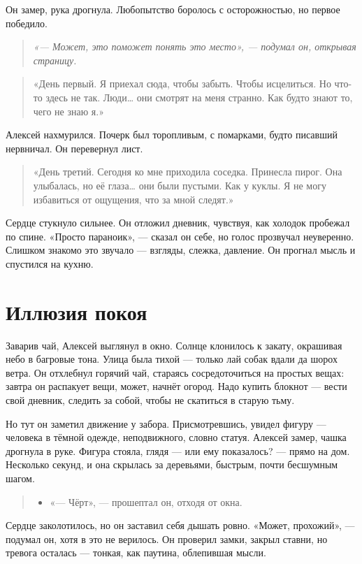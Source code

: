 \documentclass[12pt,a4paper]{book}
\newenvironment{dialogue}{\begin{quote}\itshape\begin{itemize}\item[]}{\end{itemize}\end{quote}}
\newenvironment{innerthought}{\begin{quote}\small\itshape}{\end{quote}}
\begin{document}
Он замер, рука дрогнула. Любопытство боролось с осторожностью, но первое победило.

\begin{innerthought}
«— Может, это поможет понять это место», — подумал он, открывая страницу.
\end{innerthought}

\begin{quote}
«День первый. Я приехал сюда, чтобы забыть. Чтобы исцелиться. Но что-то здесь не так. Люди… они смотрят на меня странно. Как будто знают то, чего не знаю я.»
\end{quote}

Алексей нахмурился. Почерк был торопливым, с помарками, будто писавший нервничал. Он перевернул лист.

\begin{quote}
«День третий. Сегодня ко мне приходила соседка. Принесла пирог. Она улыбалась, но её глаза… они были пустыми. Как у куклы. Я не могу избавиться от ощущения, что за мной следят.»
\end{quote}

Сердце стукнуло сильнее. Он отложил дневник, чувствуя, как холодок пробежал по спине. «Просто параноик», — сказал он себе, но голос прозвучал неуверенно. Слишком знакомо это звучало — взгляды, слежка, давление. Он прогнал мысль и спустился на кухню.

\section{Иллюзия покоя}

Заварив чай, Алексей выглянул в окно. Солнце клонилось к закату, окрашивая небо в багровые тона. Улица была тихой — только лай собак вдали да шорох ветра. Он отхлебнул горячий чай, стараясь сосредоточиться на простых вещах: завтра он распакует вещи, может, начнёт огород. Надо купить блокнот — вести свой дневник, следить за собой, чтобы не скатиться в старую тьму.

Но тут он заметил движение у забора. Присмотревшись, увидел фигуру — человека в тёмной одежде, неподвижного, словно статуя. Алексей замер, чашка дрогнула в руке. Фигура стояла, глядя — или ему показалось? — прямо на дом. Несколько секунд, и она скрылась за деревьями, быстрым, почти бесшумным шагом.

\begin{dialogue}
«— Чёрт», — прошептал он, отходя от окна.
\end{dialogue}

Сердце заколотилось, но он заставил себя дышать ровно. «Может, прохожий», — подумал он, хотя в это не верилось. Он проверил замки, закрыл ставни, но тревога осталась — тонкая, как паутина, облепившая мысли.
\end{document}
